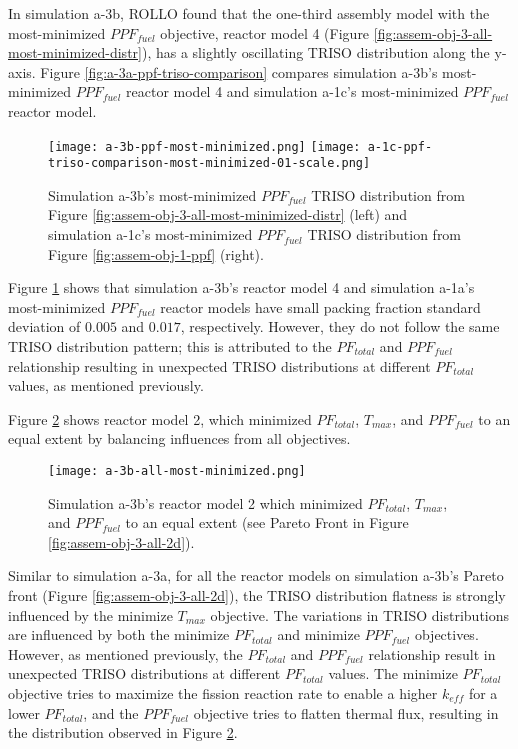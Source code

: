 In simulation a-3b, \gls{ROLLO} found that the one-third assembly model with the 
most-minimized $PPF_{fuel}$ objective, reactor model 4 (Figure 
\ref{fig:assem-obj-3-all-most-minimized-distr}), has a slightly oscillating TRISO 
distribution along the y-axis.
Figure \ref{fig:a-3a-ppf-triso-comparison} compares simulation a-3b's most-minimized 
$PPF_{fuel}$ reactor model 4 and simulation a-1c's most-minimized $PPF_{fuel}$ reactor 
model. 
\begin{figure}[htbp!]
    \centering
    \texttt{[image: a-3b-ppf-most-minimized.png]} 
    \texttt{[image: a-1c-ppf-triso-comparison-most-minimized-01-scale.png]} 
    \caption{Simulation a-3b's most-minimized $PPF_{fuel}$ TRISO distribution 
    from Figure \ref{fig:assem-obj-3-all-most-minimized-distr} (left) and simulation 
    a-1c's most-minimized $PPF_{fuel}$ TRISO distribution from Figure 
    \ref{fig:assem-obj-1-ppf} (right).}
    \label{fig:a-3b-ppf-triso-comparison}
\end{figure}
Figure \ref{fig:a-3b-ppf-triso-comparison} shows that simulation a-3b's reactor model 4 
and simulation a-1a's most-minimized $PPF_{fuel}$ reactor models have small 
packing fraction standard deviation of  $0.005$ and $0.017$, respectively. 
However, they do not follow the same TRISO distribution pattern; this is 
attributed to the $PF_{total}$ and $PPF_{fuel}$ relationship resulting in unexpected 
TRISO distributions at different $PF_{total}$ values, as mentioned previously.

Figure \ref{fig:a-3b-balanced-reactor-model} shows reactor model 2, which 
minimized $PF_{total}$, $T_{max}$, and $PPF_{fuel}$ to an equal extent by balancing 
influences from all objectives. 
\begin{figure}[htbp!]
    \centering
    \texttt{[image: a-3b-all-most-minimized.png]} 
    \caption{Simulation a-3b's reactor model 2 which minimized $PF_{total}$, $T_{max}$, 
    and $PPF_{fuel}$ to an equal extent (see Pareto Front in 
    Figure \ref{fig:assem-obj-3-all-2d}).}
\label{fig:a-3b-balanced-reactor-model}
\end{figure}
Similar to simulation a-3a, for all the reactor models on simulation a-3b's Pareto front 
(Figure \ref{fig:assem-obj-3-all-2d}), the TRISO distribution flatness is strongly 
influenced by the minimize $T_{max}$ objective. 
The variations in \gls{TRISO} distributions are influenced by both the minimize 
$PF_{total}$ and minimize $PPF_{fuel}$ objectives. 
However, as mentioned previously, the $PF_{total}$ and $PPF_{fuel}$ relationship
result in unexpected TRISO distributions at different $PF_{total}$ values. 
The minimize $PF_{total}$ objective tries to maximize the fission reaction rate
to enable a higher $k_{eff}$ for a lower $PF_{total}$, and 
the $PPF_{fuel}$ objective tries to flatten thermal flux, resulting in the 
distribution observed in Figure \ref{fig:a-3b-balanced-reactor-model}. 

